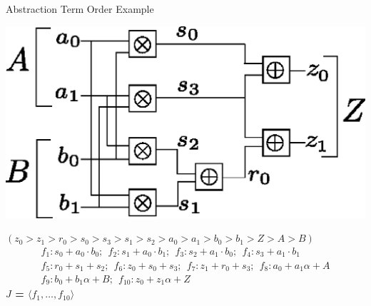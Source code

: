 \documentclass[xcolor=dvipsnames]{beamer}
\begin{document}
\begin{frame}{\large{Abstraction Term Order Example}}

\centerline{
\includegraphics[scale=0.4]{2bitmult.eps}
}
{\bf $(z_0 > z_1 > r_0 > s_0 > s_3 > s_1 > s_2 > a_0 > a_1 >  b_0 > b_1 > Z > A > B)$}
\begin{align*}
f_1: s_0+a_0 \cdot b_0; ~~f_2: s_1+a_0 \cdot b_1;  ~~f_3: s_2+a_1 \cdot b_0; ~~f_4: s_3+a_1 \cdot b_1  \nonumber \\
f_5: r_0+s_1 + s_2; ~~f_6: z_0+s_0 + s_3; ~~f_7: z_1+r_0+s_3; ~~f_8: a_0 + a_1 \alpha + A \nonumber \\ 
f_9: b_0 + b_1 \alpha + B; ~~f_{10}: z_0 + z_1 \alpha + Z \nonumber
\end{align*}
\vspace{-0.3in}
{\bf $J$ = $\langle f_1, \dots, f_{10} \rangle$}
\end{frame}

\end{document}
